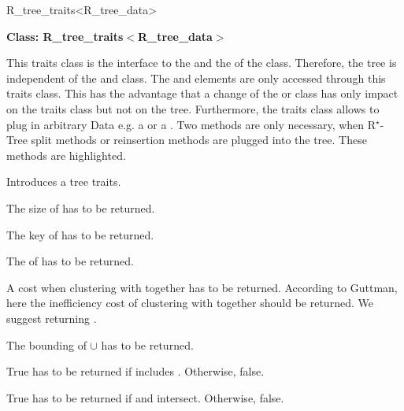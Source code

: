 \begin{ccClassTemplate}{R_tree_traits<R_tree_data>}
\label{treetraitsreq}

\noindent
{\bf Class: R\_tree\_traits$<$R\_tree\_data$>$}

This traits class is  the interface to the  and the 
 of the  class. Therefore, the tree is
independent of the  and 
 class. The  and 
 elements are only accessed through this traits
class. This has the advantage that a change of the  or 
 class has only impact on the traits class but not on
the tree. Furthermore, the traits class allows to plug in  arbitrary Data e.g. 
a  or a
. 
Two methods are only necessary, when  R$^\star$-Tree
split methods or reinsertion methods are plugged into the
tree. These methods are highlighted.




\ccTypes
{}


\ccCreation

{Introduces a tree traits.}

\ccOperations

{The size of  has to be returned.}

{The key of  has to be returned.}

{The  of  has to be returned.}

{ A cost when clustering  with  together has to be
  returned.
According to
  Guttman, here the inefficiency cost of clustering  with
   together
  should be returned. We suggest returning .}


{The bounding  of  $\cup $ has to be returned.}

{True has to be returned if  includes . Otherwise, false.}

{True has to be returned if   and 
  intersect. Otherwise, false.}


\end{ccClassTemplate}
